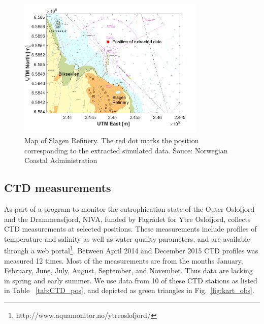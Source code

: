\clearpage


\begin{figure}[htb]
\centerline{
\includegraphics*[trim=0cm 0cm 1cm 0cm,clip=true,width=0.8\textwidth]{Figurer/Slagen_kart}}
\caption{\small
Map of Slagen Refinery. The red dot marks the position corresponding to the extracted simulated data. Souce: Norwegian Coastal Administration}
\label{fig:Slagen-kart}
\end{figure}

\clearpage
\subsection{CTD measurements}


As part of a program to monitor the eutrophication state of the Outer Oslofjord and the Drammensfjord, NIVA, funded by Fagr{\aa}det for Ytre Oslofjord, collects CTD measurements at selected positions. These measurements include profiles of temperature and salinity as well as water quality parameters, and are available through a web portal\footnote{http://www.aquamonitor.no/ytreoslofjord/}. Between April 2014 and December 2015 CTD profiles was measured 12 times. Most of the measurements are from the months January, February, June, July, August, September, and November. Thus data are lacking in spring and early summer. We use data from 10 of these CTD stations as listed in Table ~\ref{tab:CTD_pos}, and depicted as green triangles in Fig.~\ref{fig:kart_obs}. 

